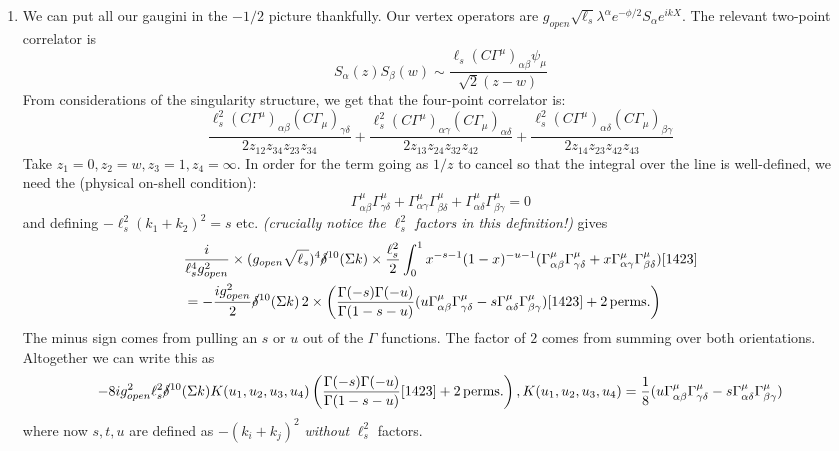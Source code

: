 \documentclass[11pt, class=article, crop=false]{standalone}
\begin{document}
\begin{enumerate}
	\item We can put all our gaugini in the $-1/2$ picture thankfully. Our vertex operators are $g_{open} \sqrt{\ell_s} \lambda^\alpha e^{-\phi/2} S_\alpha e^{ikX}$. The relevant two-point correlator is
	\[
		S_\alpha(z) S_\beta(w) \sim \frac{\ell_s (C \Gamma^\mu)_{\alpha \beta} \psi_\mu}{\sqrt 2 (z-w)}%
	\]
	 From considerations of the singularity structure, we get that the four-point correlator is:
	\[
		\frac{\ell_s^2 (C \Gamma^\mu)_{\alpha \beta} (C \Gamma_\mu)_{\gamma \delta}}{2 z_{12} z_{34} z_{23} z_{34}}
		 + \frac{\ell_s^2 (C \Gamma^\mu)_{\alpha \gamma} (C \Gamma_\mu)_{\alpha \delta}}{2 z_{13} z_{24} z_{32} z_{42}} 
		 + \frac{\ell_s^2 (C \Gamma^\mu)_{\alpha \delta} (C \Gamma_\mu)_{\beta \gamma}}{2 z_{14} z_{23} z_{42} z_{43}}
	\]
	Take $z_1 = 0, z_2 = w, z_3 = 1, z_4 = \infty$. In order for the term going as $1/z$ to cancel so that the integral over the line is well-defined, we need the (physical on-shell condition):
	\[
		\Gamma^\mu_{\alpha \beta} \Gamma^\mu_{\gamma \delta} +
		\Gamma^\mu_{\alpha \gamma} \Gamma^\mu_{\beta \delta} +
		\Gamma^\mu_{\alpha \delta} \Gamma^\mu_{\beta \gamma} = 0
	\]
	 and defining $- \ell_s^2 (k_1 + k_2)^2 = s$ etc. \emph{(crucially notice the $\ell_s^2$ factors in this definition!)} gives
	\[
	\begin{aligned}
		&\frac{i}{\ell_s^4 g_{open}^2} \times (g_{open} \sqrt{\ell_s})^4 \cancel\delta^{10}(\Sigma k) \times \frac{\ell_s^2}{2} \int_0^1 x^{-s - 1} (1-x)^{-u - 1} (\Gamma_{\alpha \beta}^\mu \Gamma_{\gamma \delta}^\mu + x \Gamma_{\alpha \gamma}^\mu \Gamma_{\beta \delta}^\mu) [1423]\\
		&= - \frac{i g_{open}^2}{2} \cancel\delta^{10}(\Sigma k) \, 2 \times \left( \frac{\Gamma(-s) \Gamma(-u)}{\Gamma(1 - s - u)} (u \Gamma_{\alpha \beta}^\mu \Gamma_{\gamma \delta}^\mu - s \Gamma_{\alpha \delta}^\mu \Gamma_{\beta \gamma}^\mu) [1423] + 2 \,\mathrm{perms.} \right)
	\end{aligned}
	\]
	The minus sign comes from pulling an $s$ or $u$ out of the $\Gamma$ functions. The factor of $2$ comes from summing over both orientations. Altogether we can write this as
	\[
		-8 i g_{open}^2 \ell_s^2 \cancel\delta^{10}(\Sigma k) K(u_1, u_2, u_3, u_4) \left( \frac{\Gamma(-s) \Gamma(-u)}{\Gamma(1 - s - u)} [1423] + 2 \,\mathrm{perms.} \right), K(u_1, u_2, u_3, u_4) = \frac18 (u \Gamma_{\alpha \beta}^\mu \Gamma_{\gamma \delta}^\mu - s \Gamma_{\alpha \delta}^\mu \Gamma_{\beta \gamma}^\mu)
	\]
	where now $s, t, u$ are defined as $-(k_i+k_j)^2$ \emph{without} $\ell_s^2$ factors.
	

\end{enumerate}
\end{document}
